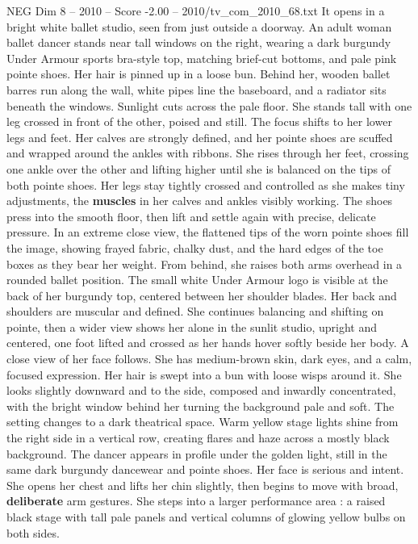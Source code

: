 \begin{textsample}{NEG Dim 8 – 2010 – Score -2.00 – 2010/tv\_com\_2010\_68.txt}  \label{ex:f8_neg_077}
It opens in a bright white ballet studio, seen from just outside a doorway.
An adult woman ballet dancer stands near tall windows on the right, wearing a dark burgundy Under Armour sports bra-style top, matching brief-cut bottoms, and pale pink pointe shoes.
Her hair is pinned up in a loose bun.
Behind her, wooden ballet barres run along the wall, white pipes line the baseboard, and a radiator sits beneath the windows.
Sunlight cuts across the pale floor.
She stands tall with one leg crossed in front of the other, poised and still.
The focus shifts to her lower legs and feet.
Her calves are strongly defined, and her pointe shoes are scuffed and wrapped around the ankles with ribbons.
She rises through her feet, crossing one ankle over the other and lifting higher until she is balanced on the tips of both pointe shoes.
Her legs stay tightly crossed and controlled as she makes tiny adjustments, the \textbf{muscles} in her calves and ankles visibly working.
The shoes press into the smooth floor, then lift and settle again with precise, delicate pressure.
In an extreme close view, the flattened tips of the worn pointe shoes fill the image, showing frayed fabric, chalky dust, and the hard edges of the toe boxes as they bear her weight.
From behind, she raises both arms overhead in a rounded ballet position.
The small white Under Armour logo is visible at the back of her burgundy top, centered between her shoulder blades.
Her back and shoulders are muscular and defined.
She continues balancing and shifting on pointe, then a wider view shows her alone in the sunlit studio, upright and centered, one foot lifted and crossed as her hands hover softly beside her body.
A close view of her face follows.
She has medium-brown skin, dark eyes, and a calm, focused expression.
Her hair is swept into a bun with loose wisps around it.
She looks slightly downward and to the side, composed and inwardly concentrated, with the bright window behind her turning the background pale and soft.
The setting changes to a dark theatrical space.
Warm yellow stage lights shine from the right side in a vertical row, creating flares and haze across a mostly black background.
The dancer appears in profile under the golden light, still in the same dark burgundy dancewear and pointe shoes.
Her face is serious and intent.
She opens her chest and lifts her chin slightly, then begins to move with broad, \textbf{deliberate} arm gestures.
She steps into a larger performance area : a raised black stage with tall pale panels and vertical columns of glowing yellow bulbs on both sides.

\end{textsample}
